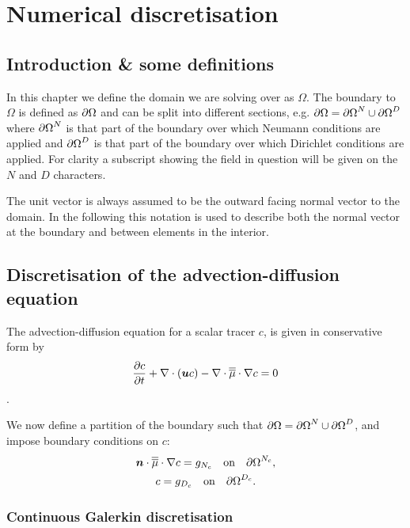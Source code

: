 \chapter{Numerical discretisation}\label{chap:numerical_discretisation}
\section{Introduction \& some definitions}\label{Sect:ND_Intro}

In this chapter we define the domain we are solving over as $\Omega$. The boundary to
$\Omega$ is defined as ${\partial\Omega}$
and can be split into different sections, e.g.
$\partial\Omega = {\partial\Omega}^{N}\cup {\partial\Omega}^{D}$
where ${\partial\Omega}^{N}$ is that part of the boundary over
which Neumann conditions are applied and ${\partial\Omega}^{D}$ is that part of the boundary over
which Dirichlet conditions are applied. For clarity a subscript showing the field in question will
be given on the $N$ and $D$ characters.

The unit vector  is always assumed to be the
outward facing normal vector to the domain.
In the following this notation is used to describe both the normal vector at the boundary
and between elements in the interior.

\section{Discretisation of the advection-diffusion equation}
\label{Sect:ND_advection_diffusion_discretisation}

The advection-diffusion equation for a scalar tracer $c$,
is given in conservative form by
\begin{equation}\label{eq:advdif}
  \frac{\partial c}{\partial t} + \nabla\cdot\left({\mbox{\boldmath$u$}} c\right) - \nabla\cdot\overline{\overline{\mu}}\cdot\nabla c = 0
\end{equation}.

We now define a partition of the boundary such that
$\partial\Omega = {\partial\Omega}^{N}\cup {\partial\Omega}^{D}$, and impose boundary conditions on $c$:
\begin{gather}
  \label{eq:cboundary}
  {\mbox{\boldmath$n$}}\cdot\overline{\overline{\mu}}\cdot\nabla c=g_{N_c} \quad\textrm{on}\quad {\partial\Omega}^{N_c},\\
  c=g_{D_c} \quad\textrm{on}\quad {\partial\Omega}^{D_c}.
\end{gather}

\subsection{Continuous Galerkin discretisation}

